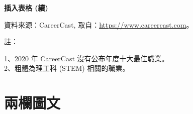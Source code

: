 \documentclass[12pt, aspectratio=169]{beamer}
\begin{document}
\linespread{1} 
\begin{frame}{\textbf{插入表格 (續)}}
\linespread{1.5} 

	\begin{table}[htbp]
		\centering 
		\caption{CareerCast 近五年五大最佳職業} 
		\extrarowheight=2pt 
		\label{CareerCast} 
		\par\smallskip
		\hspace{0.5em}\parbox{0.6\textwidth}{\scriptsize
		資料來源：CareerCast, 取自：\url{https://www.careercast.com}。\par
		註：\parbox[t]{0.5\textwidth}{\scriptsize
		1、2020 年 CareerCast 沒有公布年度十大最佳職業。\\
		 2、粗體為理工科 (STEM) 相關的職業。
		}
		}
	\end{table}

\end{frame}


\section{兩欄圖文}

\end{document}
